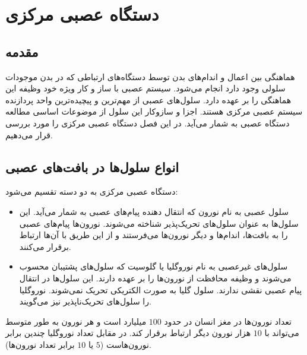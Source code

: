 \chapter{دستگاه عصبی مرکزی}
\section{مقدمه}
هماهنگی بین اعمال و اندام‌های بدن توسط دستگاه‌های ارتباطی که در بدن موجودات سلولی وجود دارد انجام می‌شود. سیستم عصبی با ساز و کار ویژه خود وظیفه این هماهنگی را بر عهده دارد. سلول‌های عصبی از مهم‌ترین و پیچیده‌ترین واحد پردازنده سیستم عصبی مرکزی هستند. اجزا و سازوکار این سلول از موضوعات اساسی مطالعه دستگاه عصبی به شمار می‌آید.
در این فصل دستگاه عصبی مرکزی را مورد بررسی قرار می‌دهیم.
\section{انواع سلول‌ها در بافت‌های عصبی}
دستگاه عصبی مرکزی به دو دسته تقسیم می‌شود:
\begin{itemize}\item سلول عصبی به نام نورون  که  انتقال دهنده‌ پیام‌‌های عصبی به شمار می‌آید. این سلول‌ها به عنوان سلول‌های تحریک‌پذیر شناخته می‌شوند. نورون‌ها پیام‌های عصبی را به بافت‌ها، اندام‌ها و دیگر نورون‌ها می‌فرستند و از این طریق با آن‌ها ارتباط برقرار می‌کنند.
\item سلول‌های غیرعصبی به نام نوروگلیا
 یا گلوسیت که سلول‌های پشتیبان محسوب می‌شوند و وظیفه محافظت از نورون‌ها را بر عهده دارند. این سلول‌ها در انتقال پیام عصبی نقشی ندارند. سلول گلیا به صورت الکتریکی تحریک نمی‌شوند. نوروگلیا را سلول‌های تحریک‌ناپذیر نیز می‌گویند. 
\end{itemize}تعداد نورون‌ها در مغز انسان در حدود $100$
 میلیارد است و هر نورون به طور متوسط می‌تواند با $10$ هزار نورون دیگر ارتباط برقرار کند. در مقابل تعداد نوروگلیا چندین برابر نورون‌هاست ($5$ یا $10$ برابر تعداد نورون‌ها).
